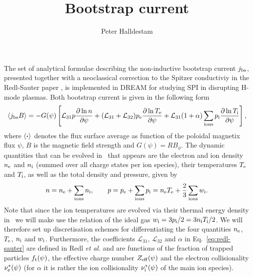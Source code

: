 \documentclass{notes}
\title{Bootstrap current}
\author{Peter Halldestam}
\newcommand{\pe}{p_{\rm e}}
\newcommand{\pii}{p_{\rm i}}
\newcommand{\te}{T_{\rm e}}
\renewcommand{\ne}{n_{\rm e}}
\newcommand{\tii}{T_{\rm i}}
\newcommand{\nii}{n_{\rm i}}
\newcommand{\wii}{w_{\rm i}}
\newcommand{\isum}{\sum_{\rm ions}}
\newcommand{\nui}{\nu_{\rm i}^*}
\newcommand{\nue}{\nu_{\rm e}^*}
\newcommand{\Zeff}{Z_{\rm eff}}
\newcommand{\ft}{f_{\rm t}}
\renewcommand{\L}[1]{\mathcal{L}_{#1}}
\newcommand{\jbs}{j_{\rm bs}}
\newcommand{\fsa}[1]{\left\langle #1 \right\rangle}
\begin{document}
    \maketitle

    \noindent
    The set of analytical formulae describing the non-inductive bootstrap current $\jbs$, presented together with a neoclassical correction to the Spitzer conductiviy in the Redl-Sauter paper \cite{Redl2021}, is implemented in DREAM for studying SPI in disrupting H-mode plasmas.
    Both bootstrap current is given in the following form
    \begin{align}
        \label{eq:redl-sauter}
        \fsa{\jbs B} =
            -G(\psi)\left[\L{31}p\pdv{\ln{n}}{\psi} + (\L{31}+\L{32})\pe\pdv{\ln{\te}}{\psi} + \L{31}(1+\alpha)\isum\pii\pdv{\ln{\tii}}{\psi}\right],
    \end{align}
    where $\fsa{\vdot}$ denotes the flux surface average as function of the poloidal magnetix flux $\psi$, $B$ is the magnetic field strength and $G(\psi)=RB_\phi$.
    The dynamic quantities that can be evolved in \DREAM\ that appears are the electron and ion density $\ne$ and $\nii$ (summed over all charge states per ion species), their temperatures $\te$ and $\tii$, as well as the total density and pressure, given by
    \begin{align}
        \label{eq:total-density-pressure}
        n=\ne+\isum\nii,\qquad p=\pe+\isum\pii=\ne\te+\frac{2}{3}\isum\wii.
    \end{align}
    Note that since the ion temperatures are evolved via their thermal energy density in \DREAM\, we will make use the relation of the ideal gas $\wii=3\pii/2=3\nii\tii/2$.
    We will therefore set up discretisation schemes for differentiating the four quantities $\ne$, $\te$, $\nii$ and $\wii$.
    Furthermore, the coefficients $\L{31}$, $\L{32}$ and $\alpha$ in Eq.~\eqref{eq:redl-sauter} are defined in Redl \textit{et al.} and are functions of the fraction of trapped particles $\ft(\psi)$, the effective charge number $\Zeff(\psi)$ and the electron collisionality $\nue(\psi)$ (for $\alpha$ it is rather the ion collisionality $\nui(\psi)$ of the main ion species).
\end{document}
